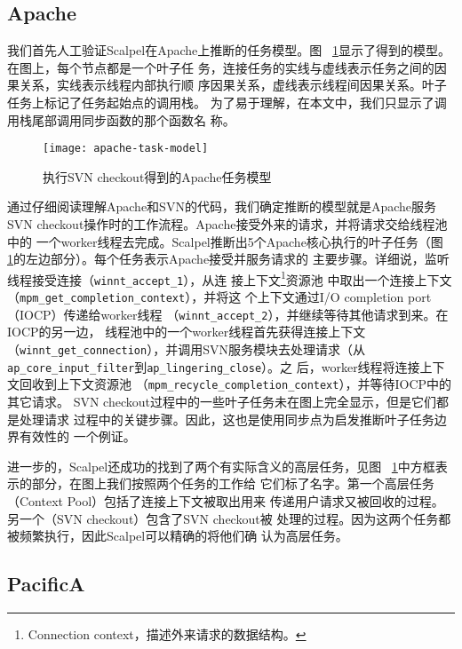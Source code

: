 \subsection{Apache}

我们首先人工验证Scalpel在Apache上推断的任务模型。图~
\ref{fig:apache_model}显示了得到的模型。在图上，每个节点都是一个叶子任
务，连接任务的实线与虚线表示任务之间的因果关系，实线表示线程内部执行顺
序因果关系，虚线表示线程间因果关系。叶子任务上标记了任务起始点的调用栈。
为了易于理解，在本文中，我们只显示了调用栈尾部调用同步函数的那个函数名
称。

\begin{figure}
\centering
\texttt{[image: apache-task-model]}
\caption{执行SVN checkout得到的Apache任务模型}
\label{fig:apache_model}
\end{figure}


通过仔细阅读理解Apache和SVN的代码，我们确定推断的模型就是Apache服务SVN
checkout操作时的工作流程。Apache接受外来的请求，并将请求交给线程池中的
一个worker线程去完成。Scalpel推断出5个Apache核心执行的叶子任务（图~
\ref{fig:apache_model}的左边部分）。每个任务表示Apache接受并服务请求的
主要步骤。详细说，监听线程接受连接（\texttt{winnt\_accept\_1}），从连
接上下文\footnote{Connection context，描述外来请求的数据结构。}资源池
中取出一个连接上下文（\texttt{mpm\_get\_completion\_context}），并将这
个上下文通过I/O completion port（IOCP）传递给worker线程
（\texttt{winnt\_accept\_2}），并继续等待其他请求到来。在IOCP的另一边，
线程池中的一个worker线程首先获得连接上下文
（\texttt{winnt\_get\_connection}），并调用SVN服务模块去处理请求（从
\texttt{ap\_core\_input\_filter}到\texttt{ap\_lingering\_close}）。之
后，worker线程将连接上下文回收到上下文资源池
（\texttt{mpm\_recycle\_completion\_context}），并等待IOCP中的其它请求。
SVN checkout过程中的一些叶子任务未在图上完全显示，但是它们都是处理请求
过程中的关键步骤。因此，这也是使用同步点为启发推断叶子任务边界有效性的
一个例证。

进一步的，Scalpel还成功的找到了两个有实际含义的高层任务，见图~
\ref{fig:apache_model}中方框表示的部分，在图上我们按照两个任务的工作给
它们标了名字。第一个高层任务（Context Pool）包括了连接上下文被取出用来
传递用户请求又被回收的过程。另一个（SVN checkout）包含了SVN checkout被
处理的过程。因为这两个任务都被频繁执行，因此Scalpel可以精确的将他们确
认为高层任务。

\subsection{PacificA}

